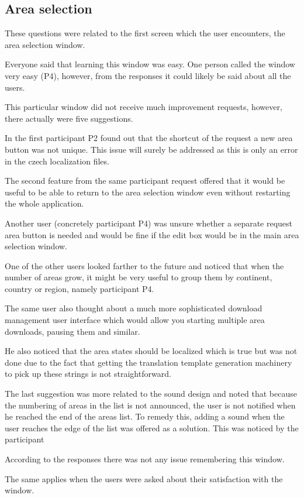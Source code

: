 \documentclass[nolof,digital]{fithesis3}
\begin{document}
\subsection{Area selection}
These questions were related to the first screen which the user encounters, the area selection window.

Everyone said that learning this window was easy. One person called the window very easy (P4), however, from the responses it could likely be said about all the users.

This particular window did not receive much improvement requests, however, there actually were five suggestions.

In the first participant P2 found out that the shortcut of the request a new area button was not unique. This issue will surely be addressed as this is only an error in the czech localization files.

The second feature from the same participant request offered that it would be useful to be able to return to the area selection window even without restarting the whole application.

Another user (concretely participant P4) was unsure whether a separate request area button is needed and would be fine if the edit box would be in the main area selection window.

One of the other users looked farther to the future and noticed that when the number of areas grow, it might be very useful to group them by continent, country or region, namely participant P4.

The same user also thought about a much more sophisticated download management user interface which would allow you starting multiple area downloads, pausing them and similar.

He also noticed that the area states should be localized which is true but was not done due to the fact that getting the translation template generation machinery to pick up these strings is not straightforward.

The last suggestion was more related to the sound design and noted that because the numbering of areas in the list is not announced, the user is not notified when he reached the end of the areas list. To remedy this, adding a sound when the user reaches the edge of the list was offered as a solution. This was noticed by the participant 

According to the responses there was not any issue remembering this window.

The same applies when the users were asked about their satisfaction with the window.
\end{document}
